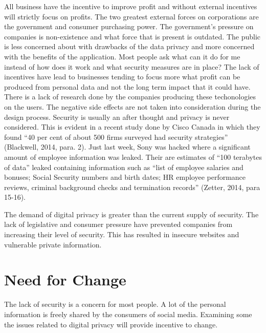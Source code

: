 \documentclass[12pt]{article}
\begin{document}
All business have the incentive to improve profit and without external incentives will strictly focus on profits. The two greatest external forces on corporations are the government and consumer purchasing power. The government's pressure on companies is non-existence and what force that is present is outdated. The public is less concerned about with drawbacks of the data privacy and more concerned with the benefits of the application. Most people ask what can it do for me instead of how does it work and what security measures are in place? The lack of incentives have lead to businesses tending to focus more what profit can be produced from personal data and not the long term impact that it could have. There is a lack of research done by the companies producing these techonologies on the users. The negative side effects are not taken into consideration during the design process. Security is usually an after thought and privacy is never considered. This is evident in a recent study done by Cisco Canada in which they found ``40 per cent of about 500 firms surveyed had security strategies'' (Blackwell, 2014, para. 2). Just last week, Sony was hacked where a significant amount of employee information was leaked. Their are estimates of ``100 terabytes of data'' leaked containing information such as ``list of employee salaries and bonuses; Social Security numbers and birth dates; HR employee performance reviews, criminal background checks and termination records'' (Zetter, 2014, para 15-16).

The demand of digital privacy is greater than the current supply of security. The lack of legislative and consumer pressure have prevented companies from increasing their level of security. This has resulted in insecure websites and vulnerable private information. 

\section{Need for Change}\label{sec:change}
The lack of security is a concern for most people. A lot of the personal information is freely shared by the consumers of social media. Examining some the issues related to digital privacy will provide incentive to change.
\end{document}
